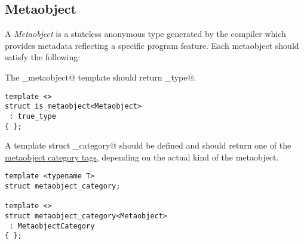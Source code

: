\subsection{Metaobject}
\label{concept-Metaobject}

A {\em Metaobject} is a stateless anonymous type generated by the compiler which
provides metadata reflecting a specific program feature. Each metaobject
should satisfy the following:

The \verb@is_metaobject@ template should return \verb@true_type@.

\begin{lstlisting}
template <>
struct is_metaobject<Metaobject>
 : true_type
{ };
\end{lstlisting}

A template struct \verb@metaobject_category@ should be defined and should return one of the
\hyperref[metaobject-category-tags]{metaobject category tags}, depending on
the actual kind of the metaobject.

\begin{lstlisting}
template <typename T>
struct metaobject_category;

template <>
struct metaobject_category<Metaobject>
 : MetaobjectCategory
{ };
\end{lstlisting}

